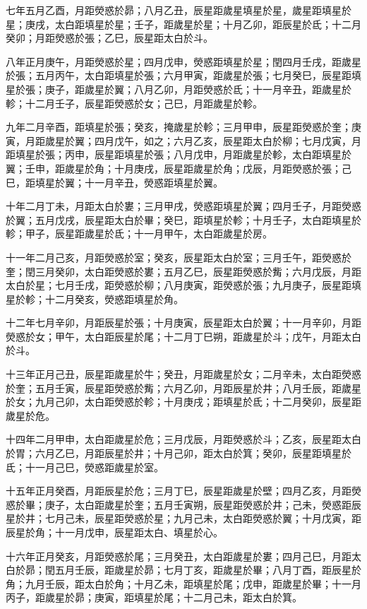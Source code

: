 \begin{pinyinscope}
七年五月乙酉，月距熒惑於昴；八月乙丑，辰星距歲星填星於星，歲星距填星於星；庚戌，太白距填星於星；壬子，距歲星於星；十月乙卯，距辰星於氐；十二月癸卯；月距熒惑於張；乙巳，辰星距太白於斗。

八年正月庚午，月距熒惑於星；四月戊申，熒惑距填星於星；閏四月壬戌，距歲星於張；五月丙午，太白距填星於張；六月甲寅，距歲星於張；七月癸巳，辰星距填星於張；庚子，距歲星於翼；八月乙卯，月距熒惑於氐；十一月辛丑，距歲星於軫；十二月壬子，辰星距熒惑於女；己巳，月距歲星於軫。

九年二月辛酉，距填星於張；癸亥，掩歲星於軫；三月甲申，辰星距熒惑於奎；庚寅，月距歲星於翼；四月戊午，如之；六月乙亥，辰星距太白於柳；七月戊寅，月距填星於張；丙申，辰星距填星於張；八月戊申，月距歲星於軫，太白距填星於翼；壬申，距歲星於角；十月庚戌，辰星距歲星於角；戊辰，月距熒惑於張；己巳，距填星於翼；十一月辛丑，熒惑距填星於翼。

十年二月丁未，月距太白於婁；三月甲戌，熒惑距填星於翼；四月壬子，月距熒惑於翼；五月戊戌，辰星距太白於畢；癸巳，距填星於軫；十月壬子，太白距填星於軫；甲子，辰星距歲星於氐；十一月甲午，太白距歲星於房。

十一年二月己亥，月距熒惑於室；癸亥，辰星距太白於室；三月壬午，距熒惑於奎；閏三月癸卯，太白距熒惑於婁；五月乙巳，辰星距熒惑於觜；六月戊辰，月距太白於星；七月壬戌，距熒惑於柳；八月庚寅，距熒惑於張；九月庚子，辰星距填星於軫；十二月癸亥，熒惑距填星於角。

十二年七月辛卯，月距辰星於張；十月庚寅，辰星距太白於翼；十一月辛卯，月距熒惑於女；甲午，太白距辰星於尾；十二月丁巳朔，距歲星於斗；戊午，月距太白於斗。

十三年正月己丑，辰星距歲星於牛；癸丑，月距歲星於女；二月辛未，太白距熒惑於奎；五月壬寅，辰星距熒惑於觜；六月乙卯，月距辰星於井；八月壬辰，距歲星於女；九月己卯，太白距熒惑於軫；十月庚戌；距填星於氐；十二月癸卯，辰星距歲星於危。

十四年二月甲申，太白距歲星於危；三月戊辰，月距熒惑於斗；乙亥，辰星距太白於胃；六月乙巳，月距辰星於井；十月己卯，距太白於箕；癸卯，辰星距填星於氐；十一月己巳，熒惑距歲星於室。

十五年正月癸酉，月距辰星於危；三月丁巳，辰星距歲星於壁；四月乙亥，月距熒惑於畢；庚子，太白距歲星於奎；五月壬寅朔，辰星距熒惑於井；己未，熒惑距辰星於井；七月己未，辰星距熒惑於星；九月己未，太白距熒惑於翼；十月戊寅，距辰星於角；十一月戊申，辰星距太白、填星於心。

十六年正月癸亥，月距熒惑於尾；三月癸丑，太白距歲星於婁；四月己巳，月距太白於昴；閏五月壬辰，距歲星於昴；七月丁亥，距歲星於畢；八月丁酉，距辰星於角；九月壬辰，距太白於角；十月乙未，距填星於尾；戊申，距歲星於畢；十一月丙子，距歲星於昴；庚寅，距填星於尾；十二月己未，距太白於箕。


\end{pinyinscope}
